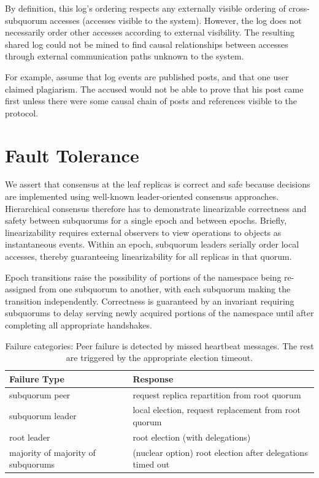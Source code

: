 By definition, this log's ordering respects any externally visible ordering of cross-subquorum accesses (accesses visible to the system).
However, the log does not necessarily order other accesses according to external visibility.
The resulting shared log could not be mined to find causal relationships between accesses through external communication paths unknown to the system.

For example, assume that log events are published posts, and that one user claimed plagiarism.
The accused would not be able to prove that his post came first unless there were some causal chain of posts and references visible to the protocol.


\section{Fault Tolerance}
\label{sec:fault_tolerance}

We assert that consensus at the leaf replicas is correct and safe because decisions are implemented using well-known leader-oriented consensus approaches.
Hierarchical consensus therefore has to demonstrate linearizable correctness and safety between subquorums for a single epoch and between epochs.
Briefly, linearizability requires external observers to view operations to objects as instantaneous events.
Within an epoch, subquorum leaders serially order local accesses, thereby guaranteeing linearizability for all replicas in that quorum.

Epoch transitions raise the possibility of portions of the namespace being re-assigned from one subquorum to another, with each subquorum making the transition independently.
Correctness is guaranteed by an invariant requiring subquorums to delay serving newly acquired portions of the namespace until after completing all appropriate handshakes.


\begin{landscape}
\renewcommand{\baselinestretch}{1}
\small\normalsize
 \begin{table}[ht]
\caption[HC Failure Categories]{Failure categories: Peer failure is detected by missed heartbeat messages. The rest are triggered by the appropriate election timeout.}
\begin{center}
\begin{tabular}{l|l}
\hline
Failure Type & Response \\
\hline \hline
subquorum peer & request replica repartition from root quorum \\
subquorum leader & local election, request replacement from root quorum \\
root leader & root election (with delegations)\\
majority of majority of subquorums & (nuclear option) root election after delegations timed out \\
\hline
\end{tabular}
\end{center}
\label{tab:failure_categories}
\end{table}
 \renewcommand{\baselinestretch}{2}
\small\normalsize
\end{landscape}


